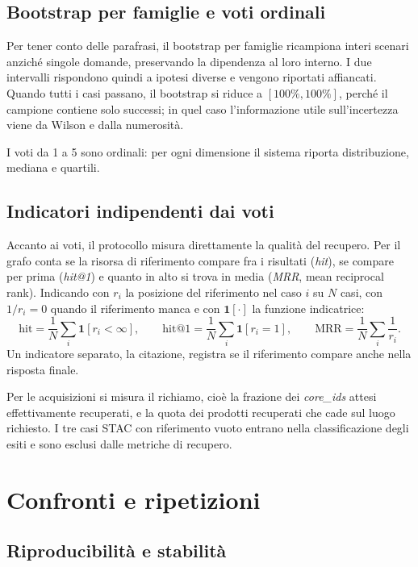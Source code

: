 \subsection{Bootstrap per famiglie e voti ordinali}

Per tener conto delle parafrasi, il bootstrap per famiglie ricampiona interi
scenari anziché singole domande, preservando la dipendenza al loro interno. I
due intervalli rispondono quindi a ipotesi diverse e vengono riportati
affiancati. Quando tutti i casi passano, il bootstrap si riduce a
$[100\%,100\%]$, perché il campione contiene solo successi; in quel caso
l'informazione utile sull'incertezza viene da Wilson e dalla numerosità.

I voti da 1 a 5 sono ordinali: per ogni dimensione il sistema riporta
distribuzione, mediana e quartili.

\subsection{Indicatori indipendenti dai voti}

Accanto ai voti, il protocollo misura direttamente la qualità del recupero.
Per il grafo conta se la risorsa di riferimento compare fra i risultati
(\emph{hit}), se compare per prima (\emph{hit@1}) e quanto in alto si trova in
media (\emph{MRR}, mean reciprocal rank). Indicando con $r_i$ la posizione del
riferimento nel caso $i$ su $N$ casi, con $1/r_i=0$ quando il riferimento manca
e con $\mathbf{1}[\cdot]$ la funzione indicatrice:
\[
 \mathrm{hit}=\frac{1}{N}\sum_i\mathbf{1}[r_i<\infty],\qquad
 \mathrm{hit@1}=\frac{1}{N}\sum_i\mathbf{1}[r_i=1],\qquad
 \mathrm{MRR}=\frac{1}{N}\sum_i\frac{1}{r_i}.
\]
Un indicatore separato, la citazione, registra se il riferimento compare anche
nella risposta finale.

Per le acquisizioni si misura il richiamo, cioè la frazione dei \emph{core\_ids}
attesi effettivamente recuperati, e la quota dei prodotti recuperati che cade
sul luogo richiesto. I tre casi STAC con riferimento vuoto entrano nella
classificazione degli esiti e sono esclusi dalle metriche di recupero.

\section{Confronti e ripetizioni}

\subsection{Riproducibilità e stabilità}

